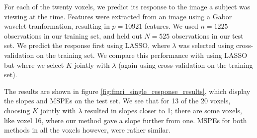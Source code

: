 \documentclass[main]{subfiles}
\begin{document}
For each of the twenty voxels, we predict its response to the image a subject was viewing at the time.
Features were extracted from an
image using a Gabor wavelet tranformation, resulting in $p = 10921$ features.
We used $n = 1225$ observations in our training set, and held out $N = 525$ observations in our test set. We predict the response
first using LASSO, where $\lambda$ was selected using cross-validation on the training set. We compare this performance with
using LASSO but where we select $K$ jointly with $\lambda$ (again using cross-validation on the training set).

The results are shown in figure \ref{fig:fmri_single_response_results}, which display the slopes and MSPEs on the test set.
We see that for 13 of the 20 voxels, choosing $K$ jointly with $\lambda$ resulted in slopes closer to 1; there are some voxels,
like voxel 16, where our method gave a slope further from one.  MSPEs for both methods in all the voxels however,
were rather similar.
\end{document}
